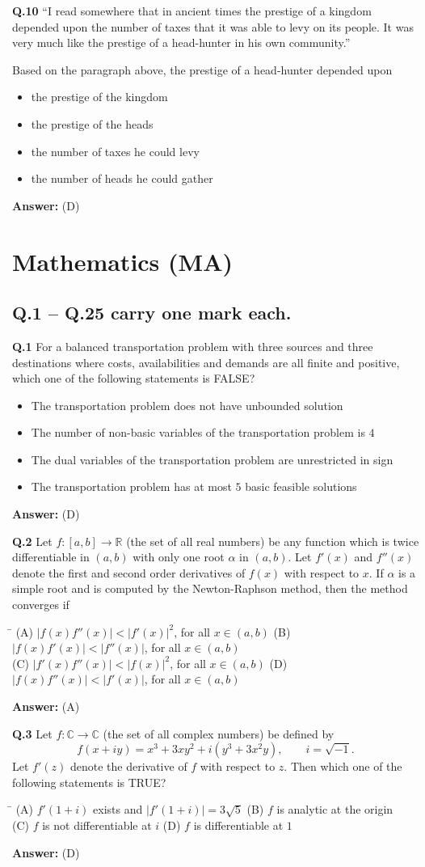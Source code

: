 \documentclass[11pt,a4paper]{article}
\newcommand{\optsfourA}[4]{%
  \begin{tabbing}
    \hspace{0.48\linewidth}\=\kill
    (A) #1 \> (B) #2 \\[2pt]
    (C) #3 \> (D) #4
  \end{tabbing}%
}
\newcommand{\optslistA}[4]{%
  \begin{itemize}
    \setlength{\itemsep}{2pt}\setlength{\parskip}{0pt}
    \item[(A)] #1
    \item[(B)] #2
    \item[(C)] #3
    \item[(D)] #4
  \end{itemize}%
}
\newcommand{\ans}[1]{\textbf{Answer:} #1\par\medskip}
\begin{document}
\textbf{Q.10} ``I read somewhere that in ancient times the prestige of a kingdom depended upon the number of taxes that it was able to levy on its people. It was very much like the prestige of a head-hunter in his own community.''

Based on the paragraph above, the prestige of a head-hunter depended upon \underline{\hspace{2.5cm}}
\optslistA{the prestige of the kingdom}{the prestige of the heads}{the number of taxes he could levy}{the number of heads he could gather}
\ans{(D)}

\section*{Mathematics (MA)}

\subsection*{Q.1 -- Q.25 carry one mark each.}

\textbf{Q.1} For a balanced transportation problem with three sources and three destinations where costs, availabilities and demands are all finite and positive, which one of the following statements is FALSE?
\optslistA{The transportation problem does not have unbounded solution}{The number of non-basic variables of the transportation problem is $4$}{The dual variables of the transportation problem are unrestricted in sign}{The transportation problem has at most $5$ basic feasible solutions}
\ans{(D)}

\textbf{Q.2} Let $f : [a, b] \to \mathbb{R}$ (the set of all real numbers) be any function which is twice differentiable in $(a, b)$ with only one root $\alpha$ in $(a, b)$. Let $f'(x)$ and $f''(x)$ denote the first and second order derivatives of $f(x)$ with respect to $x$. If $\alpha$ is a simple root and is computed by the Newton-Raphson method, then the method converges if
\optsfourA{$|f(x) f''(x)| < |f'(x)|^2$, for all $x \in (a, b)$}{$|f(x) f'(x)| < |f''(x)|$, for all $x \in (a, b)$}{$|f'(x) f''(x)| < |f(x)|^2$, for all $x \in (a, b)$}{$|f(x) f''(x)| < |f'(x)|$, for all $x \in (a, b)$}
\ans{(A)}

\textbf{Q.3} Let $f : \mathbb{C} \to \mathbb{C}$ (the set of all complex numbers) be defined by
\[
  f(x + iy) = x^3 + 3xy^2 + i(y^3 + 3x^2 y), \qquad i = \sqrt{-1}.
\]
Let $f'(z)$ denote the derivative of $f$ with respect to $z$. Then which one of the following statements is TRUE?
\optsfourA{$f'(1 + i)$ exists and $|f'(1 + i)| = 3\sqrt{5}$}{$f$ is analytic at the origin}{$f$ is not differentiable at $i$}{$f$ is differentiable at $1$}
\ans{(D)}
\end{document}
